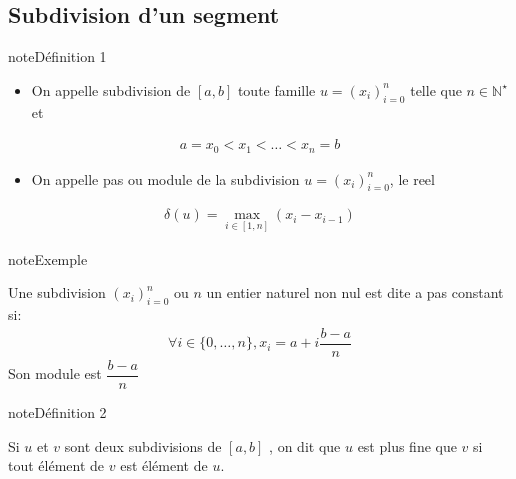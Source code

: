 \documentclass[letterpaper,10pt,french]{jupyterBook}
\begin{document}
\subsection{Subdivision d’un segment}
\label{\detokenize{fe:subdivision-d-un-segment}}
\begin{sphinxadmonition}{note}{Définition 1}
\begin{itemize}
\item {} 
\sphinxAtStartPar
On appelle subdivision de \([a, b]\) toute famille \(u=(x_i)_{i=0}^n\) telle que \(n \in \mathbb{N}^\star\) et

\end{itemize}
\begin{equation*}
\begin{split}
a=x_0 < x_1 < \ldots < x_n=b
\end{split}
\end{equation*}\begin{itemize}
\item {} 
\sphinxAtStartPar
On appelle pas ou module de la subdivision \(u=(x_i)_{i=0}^n\), le reel

\end{itemize}
\begin{equation*}
\begin{split}
\delta(u)=\max_{i \in [1, n]}(x_i - x_{i-1})
\end{split}
\end{equation*}\end{sphinxadmonition}

\begin{sphinxadmonition}{note}{Exemple}

\sphinxAtStartPar
Une subdivision \((x_i)_{i=0}^n\) ou \(n\) un entier naturel non nul est dite a pas constant si:
\begin{equation*}
\begin{split}
\forall i \in \{0, \ldots, n\}, x_i = a+i\dfrac{b-a}{n}
\end{split}
\end{equation*}
\sphinxAtStartPar
Son module est \(\dfrac{b-a}{n}\)
\end{sphinxadmonition}

\begin{sphinxadmonition}{note}{Définition 2}

\sphinxAtStartPar
Si \(u\) et \(v\) sont deux subdivisions de \([a, b]\) , on dit que \(u\) est plus fine que \(v\) si tout élément de \(v\) est élément de \(u\).
\end{sphinxadmonition}
\end{document}
